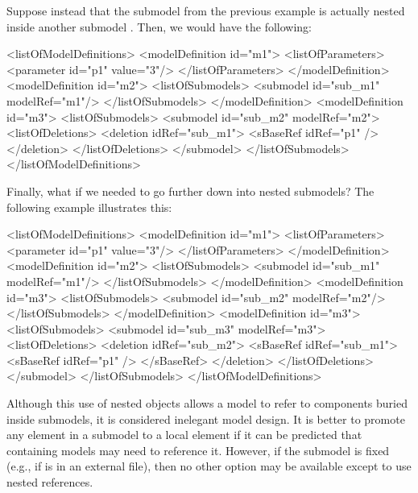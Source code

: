Suppose instead that the submodel  from the previous example is
actually nested inside another submodel .  Then, we would have
the following:

\begin{example}
<listOfModelDefinitions>
  <modelDefinition id="m1">
    <listOfParameters>
      <parameter id="p1" value="3"/>
    </listOfParameters>
  </modelDefinition>
  <modelDefinition id="m2">
    <listOfSubmodels>
      <submodel id="sub_m1" modelRef="m1"/>
    </listOfSubmodels>    
  </modelDefinition>
  <modelDefinition id="m3">
    <listOfSubmodels>
      <submodel id="sub_m2" modelRef="m2">
        <listOfDeletions>
          <deletion idRef="sub_m1">
            <sBaseRef idRef="p1" />
          </deletion>
        </listOfDeletions>
      </submodel>
    </listOfSubmodels>    
</listOfModelDefinitions>
\end{example}

Finally, what if we needed to go further down into nested submodels?
The following example illustrates this:

\begin{example}
<listOfModelDefinitions> 
  <modelDefinition id="m1"> 
    <listOfParameters> 
      <parameter id="p1" value="3"/> 
    </listOfParameters> 
  </modelDefinition> 
  <modelDefinition id="m2"> 
    <listOfSubmodels> 
      <submodel id="sub_m1" modelRef="m1"/> 
    </listOfSubmodels>     
  </modelDefinition> 
  <modelDefinition id="m3"> 
    <listOfSubmodels> 
      <submodel id="sub_m2" modelRef="m2"/> 
    </listOfSubmodels>     
  </modelDefinition> 
  <modelDefinition id="m3"> 
    <listOfSubmodels> 
      <submodel id="sub_m3" modelRef="m3"> 
        <listOfDeletions> 
          <deletion idRef="sub_m2"> 
            <sBaseRef idRef="sub_m1"> 
              <sBaseRef idRef="p1" />
            </sBaseRef> 
          </deletion> 
        </listOfDeletions> 
      </submodel> 
    </listOfSubmodels>     
</listOfModelDefinitions> 
\end{example}


Although this use of nested \SBaseRef objects allows a model to refer to
components buried inside submodels, it is considered inelegant model
design.  It is better to promote any element in a submodel to a local
element if it can be predicted that containing models may need to
reference it.  However, if the submodel is fixed (e.g., if is in an
external file), then no other option may be available except to use
nested references.



